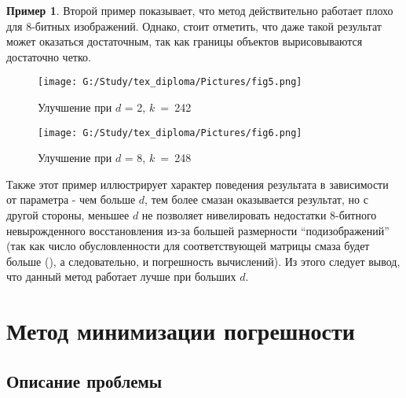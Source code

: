 \documentclass[a4paper]{article}
\theoremstyle{definition}
\newtheorem{example}{Пример}[section]
\begin{document}
\begin{example}

Второй пример показывает, что метод действительно работает плохо для 8-битных изображений. Однако, стоит отметить, что даже такой результат может оказаться достаточным, так как границы объектов вырисовываются достаточно четко.

\hspace*{-\parindent}
\begin{minipage}{80mm}
    \begin{figure}[H]
            \texttt{[image: G:/Study/tex\_diploma/Pictures/fig5.png]}
            \label{Fig3}
            \caption[Улучшение при $d$ = 2, $k$~=~242]{Улучшение при $d$ = 2, $k$~=~242}
        \end{figure}
\end{minipage}
\begin{minipage}{80mm}
  \begin{figure}[H]
            \texttt{[image: G:/Study/tex\_diploma/Pictures/fig6.png]}
            \label{Fig4}
            \caption[Улучшение при $d$ = 8, $k$~=~248]{Улучшение при $d$ = 8, $k$~=~248}
        \end{figure}
\end{minipage}
\hfill

\vspace*{5mm}


Также этот пример иллюстрирует характер поведения результата в зависимости от параметра - чем больше $d$, тем более смазан оказывается результат, но с другой стороны, меньшее $d$ не позволяет нивелировать недостатки 8-битного невырожденного восстановления из-за большей размерности ``подизображений'' (так как число обусловленности для соответствующей матрицы смаза будет больше (\cite{cond}), а следовательно, и погрешность вычислений). Из этого следует вывод, что данный метод работает лучше при больших $d$.

\end{example}


    \newpage


    \section{Метод минимизации погрешности}

    \subsection{Описание проблемы}
\end{document}
